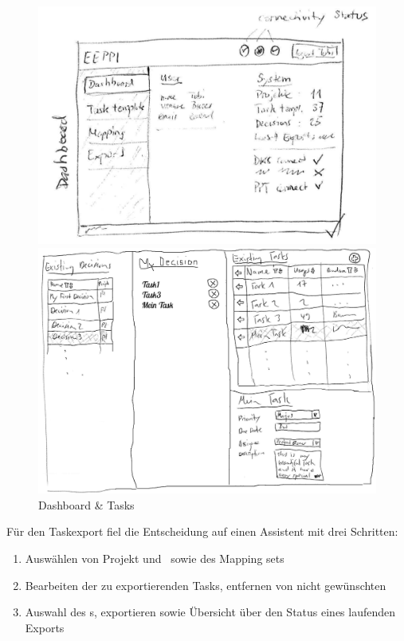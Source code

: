 		\begin{figure}[H]
			\begin{minipage}[b]{0.5\linewidth}
				\includegraphics[width=\linewidth]{interfacesAndProtocols/media/img/dashboard.jpg}
			\end{minipage}
			\begin{minipage}[b]{0.5\linewidth}	
				\includegraphics[width=\linewidth]{interfacesAndProtocols/media/img/tasks.jpg}
			\end{minipage}
			\caption{Dashboard \& Tasks}
			\label{fig:dashboardAndTasks}
		\end{figure}
		
		Für den Taskexport fiel die Entscheidung auf einen Assistent mit drei Schritten:
		\begin{enumerate}
			\item Auswählen von Projekt und \dks\ sowie des Mapping sets
			\item Bearbeiten der zu exportierenden Tasks, entfernen von nicht gewünschten
			\item Auswahl des \ppt s, exportieren sowie Übersicht über den Status eines laufenden Exports
		\end{enumerate}
		

